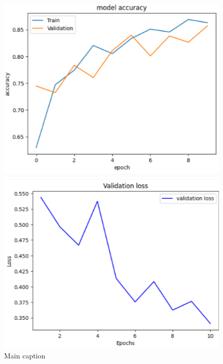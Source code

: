 \begin{figure}[ht]
  \centering
  \begin{minipage}[b]{0.4\linewidth}
    \centering
    \includegraphics[width=\linewidth]{Chapters/Chapter_5/figures/model_accurecy.png}
  \end{minipage}
  \hfill
  \begin{minipage}[b]{0.4\linewidth}
    \centering
    \includegraphics[width=\linewidth]{Chapters/Chapter_5/figures/validationloss.png}
  \end{minipage}
  \caption{Main caption}
  \label{fig:figure5_3}
  \end{figure}
  
  
  
  
  
  
  
  
